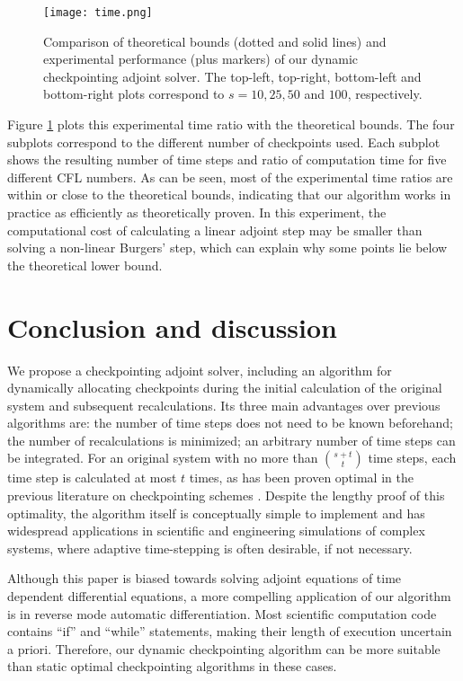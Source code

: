 \documentclass[oneeqnum, onethmnum, onefignum, onetabnum]{siamltex}
\begin{document}
\begin{figure}[htp] \center
    \texttt{[image: time.png]}
    \caption{Comparison of theoretical bounds (dotted and solid lines) and
             experimental
             performance (plus markers) of our dynamic checkpointing adjoint
             solver.  The top-left, top-right, bottom-left and bottom-right
             plots correspond to $s = 10, 25, 50$ and $100$, respectively.
            }
    \label{fig1} 
\end{figure}

Figure \ref{fig1} plots this experimental time ratio with the theoretical
bounds.  The four subplots correspond to the different number of checkpoints
used.
Each subplot shows the resulting number of time steps and ratio of computation
time for five different CFL numbers.
As can be seen, most of the experimental time
ratios are within or close to the theoretical bounds, indicating that our
algorithm works in practice as efficiently as theoretically proven.  In this
experiment, the computational cost of calculating a linear adjoint step may be
smaller than solving a non-linear Burgers' step, which can explain why some
points lie below the theoretical lower bound.





\section{Conclusion and discussion} \label{sec_conc}

We propose a checkpointing adjoint solver, including an algorithm for
dynamically allocating checkpoints during the initial calculation of the
original system and subsequent recalculations.
Its three main advantages
over previous algorithms are: the number of time steps does not need to be
known beforehand; the number of recalculations is minimized; an arbitrary
number of time steps can be integrated.  For an original system with no more
than $\binom{s + t}{t}$ time steps, each time step is calculated
at most $t$ times, as has been proven optimal in the previous literature on
checkpointing schemes \cite{griewank92}.  Despite the lengthy proof of this
optimality, the algorithm itself is conceptually simple to implement and has
widespread applications in scientific and engineering simulations of complex
systems, where adaptive time-stepping is often desirable, if not necessary.

Although this paper is biased towards solving adjoint equations of time
dependent differential equations, a more compelling application of our
algorithm is in reverse mode automatic differentiation.  Most scientific
computation code contains ``if'' and ``while'' statements, making
their length of execution uncertain a priori.  Therefore, our dynamic
checkpointing algorithm can be more suitable than static optimal checkpointing
algorithms in these cases.
\end{document}
